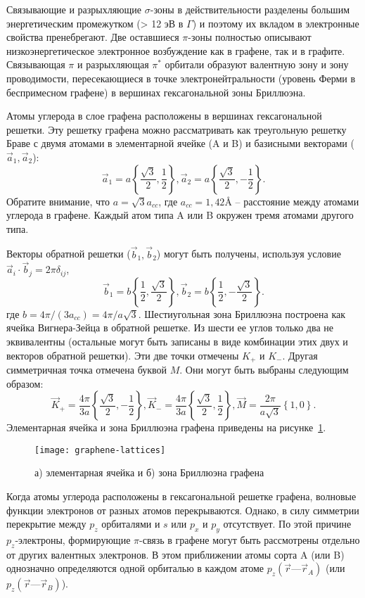  Связывающие и разрыхляющие \(\sigma\)-зоны в действительности разделены большим энергетическим промежутком (> 12 эВ в \(\Gamma\)) и поэтому их вкладом в электронные свойства пренебрегают. Две оставшиеся \(\pi\)-зоны полностью описывают низкоэнергетическое электронное возбуждение как в графене, так и в графите. Связывающая \(\pi\) и разрыхляющая \(\pi^*\) орбитали образуют валентную зону и зону проводимости, пересекающиеся в точке электронейтральности (уровень Ферми в беспримесном графене) в вершинах гексагональной зоны Бриллюэна.

 Атомы углерода в слое графена расположены в вершинах гексагональной решетки. Эту решетку графена можно рассматривать как треугольную решетку Браве с двумя атомами в элементарной ячейке (A и B) и базисными векторами (\(\vec{a}_1, \vec{a}_2\)):
\[
    \vec{a}_1 = a\left\{\frac{\sqrt{3}}{2}, \frac{1}{2}\right\},
    \vec{a}_2 = a\left\{\frac{\sqrt{3}}{2}, -\frac{1}{2}\right\}.
\]
Обратите внимание, что \(a = \sqrt{3}a_{cc}\), где \(a_{cc} = 1,\!42 \text{\AA}\) -- расстояние между атомами углерода в графене. Каждый атом типа A или B окружен тремя атомами другого типа.

Векторы обратной решетки (\(\vec{b}_1, \vec{b}_2\)) могут быть получены, используя условие \(\vec{a}_i\cdot\vec{b}_j = 2\pi\delta_{ij}\),
\[
    \vec{b}_1 = b\left\{\frac{1}{2},\frac{\sqrt{3}}{2}\right\},
    \vec{b}_2 = b\left\{\frac{1}{2}, -\frac{\sqrt{3}}{2}\right\}.
\]
где \(b = 4\pi/(3a_{cc}) = 4\pi/a\sqrt{3}\). Шестиугольная зона Бриллюэна построена как ячейка Вигнера-Зейца в обратной решетке. Из шести ее углов только два не эквивалентны (остальные могут быть записаны в виде комбинации этих двух и векторов обратной решетки). Эти две точки отмечены \(K_+\) и \(K_-\). Другая симметричная точка отмечена буквой \( M \). Они могут быть выбраны следующим образом:
\[
    \vec{K}_+ = \frac{4\pi}{3a}\left\{\frac{\sqrt{3}}{2},-\frac{1}{2}\right\},
    \vec{K}_- = \frac{4\pi}{3a}\left\{\frac{\sqrt{3}}{2}, \frac{1}{2}\right\},
    \vec{M} = \frac{2\pi}{a\sqrt{3}}\left\{1,0\right\}.
\]
Элементарная ячейка и зона Бриллюэна графена приведены на рисунке~\ref{fig:graphene-lattices}.
\begin{figure}[ht]
  \center
  \texttt{[image: graphene-lattices]}
  \caption{а) элементарная ячейка и б) зона Бриллюэна графена}
  \label{fig:graphene-lattices}
\end{figure}

Когда атомы углерода расположены в гексагональной решетке графена, волновые функции электронов от разных атомов перекрываются. Однако, в силу симметрии перекрытие между \(p_z\) орбиталями и \(s\) или \(p_x\) и \(p_y\) отсутствует. По этой причине \(p_z\)-электроны, формирующие \(\pi\)-связь в графене могут быть рассмотрены отдельно от других валентных электронов. В этом приближении атомы сорта A (или B) однозначно определяются одной орбиталью в каждом атоме \(p_z(\vec{r} — \vec{r}_A)\) (или \(p_z(\vec{r} — \vec{r}_B)\)).


